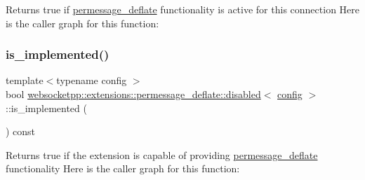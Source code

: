 Returns true if \mbox{\hyperlink{namespacewebsocketpp_1_1extensions_1_1permessage__deflate}{permessage\+\_\+deflate}} functionality is active for this connection Here is the caller graph for this function\+:
\mbox{\label{classwebsocketpp_1_1extensions_1_1permessage__deflate_1_1disabled_a2471ea045dfff17b36effd61319fc87a}} 
\subsubsection{\texorpdfstring{is\+\_\+implemented()}{is\_implemented()}}
{\footnotesize\ttfamily template$<$typename config $>$ \\
bool \mbox{\hyperlink{classwebsocketpp_1_1extensions_1_1permessage__deflate_1_1disabled}{websocketpp\+::extensions\+::permessage\+\_\+deflate\+::disabled}}$<$ \mbox{\hyperlink{classconfig}{config}} $>$\+::is\+\_\+implemented (\begin{DoxyParamCaption}{ }\end{DoxyParamCaption}) const\hspace{0.3cm}{\ttfamily [inline]}}

Returns true if the extension is capable of providing \mbox{\hyperlink{namespacewebsocketpp_1_1extensions_1_1permessage__deflate}{permessage\+\_\+deflate}} functionality Here is the caller graph for this function\+:
\mbox{\label{classwebsocketpp_1_1extensions_1_1permessage__deflate_1_1disabled_a3de3aad5ffeef60e3713cc29dec7b140}} 
